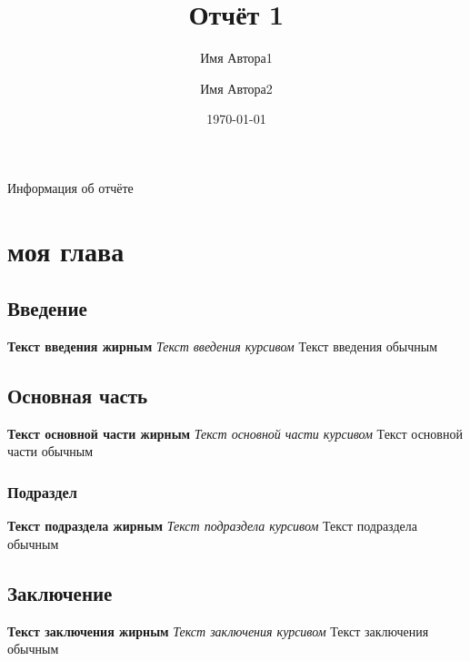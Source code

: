 \documentclass[14pt]{report}
\title{Отчёт 1}
\author{Имя Автора1 \and Имя Автора2}
\date{\today}
\begin{document}
\maketitle

\begin{center}
    {\huge Информация об отчёте}
\end{center}
\renewcommand{\contentsname}{Содержание}
\tableofcontents

\newpage
\chapter{моя глава}
\section{Введение}
\tiny{\textbf{Текст введения жирным} \textit{Текст введения курсивом} Текст введения обычным}

\section{Основная часть}
\large{\textbf{Текст основной части жирным} \textit{Текст основной части курсивом} Текст основной части обычным}

\subsection{Подраздел}
\large{\textbf{Текст подраздела жирным} \textit{Текст подраздела курсивом} Текст подраздела обычным}

\section{Заключение}
\huge{\textbf{Текст заключения жирным} \textit{Текст заключения курсивом} Текст заключения обычным}
\end{document}
